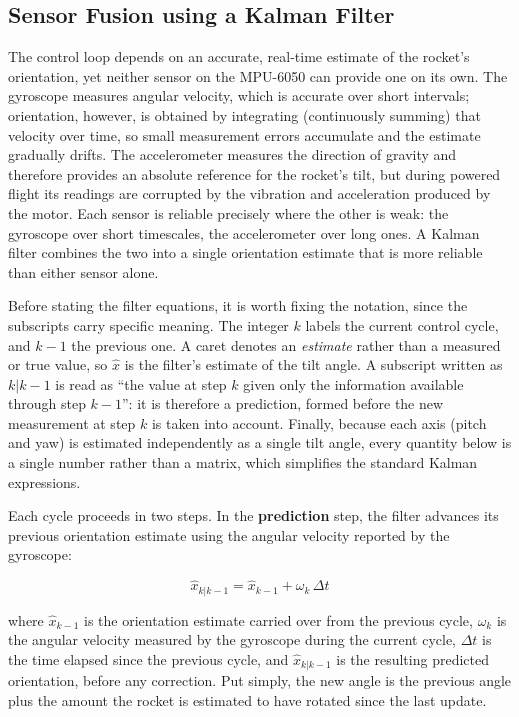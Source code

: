 \subsection{Sensor Fusion using a Kalman Filter}
\label{subsec:kalman}
 
The control loop depends on an accurate, real-time estimate of the rocket's orientation, yet neither sensor on the MPU-6050 can provide one on its own. The gyroscope measures angular velocity, which is accurate over short intervals; orientation, however, is obtained by integrating (continuously summing) that velocity over time, so small measurement errors accumulate and the estimate gradually drifts. The accelerometer measures the direction of gravity and therefore provides an absolute reference for the rocket's tilt, but during powered flight its readings are corrupted by the vibration and acceleration produced by the motor. Each sensor is reliable precisely where the other is weak: the gyroscope over short timescales, the accelerometer over long ones. A Kalman filter \cite{kalman1960} combines the two into a single orientation estimate that is more reliable than either sensor alone.
 
Before stating the filter equations, it is worth fixing the notation, since the subscripts carry specific meaning. The integer $k$ labels the current control cycle, and $k-1$ the previous one. A caret denotes an \emph{estimate} rather than a measured or true value, so $\hat{x}$ is the filter's estimate of the tilt angle. A subscript written as $k|k-1$ is read as ``the value at step $k$ given only the information available through step $k-1$'': it is therefore a prediction, formed before the new measurement at step $k$ is taken into account. Finally, because each axis (pitch and yaw) is estimated independently as a single tilt angle, every quantity below is a single number rather than a matrix, which simplifies the standard Kalman expressions.
 
Each cycle proceeds in two steps. In the \textbf{prediction} step, the filter advances its previous orientation estimate using the angular velocity reported by the gyroscope:
 
\[
\hat{x}_{k|k-1} = \hat{x}_{k-1} + \omega_k\,\Delta t
\]
 
where $\hat{x}_{k-1}$ is the orientation estimate carried over from the previous cycle, $\omega_k$ is the angular velocity measured by the gyroscope during the current cycle, $\Delta t$ is the time elapsed since the previous cycle, and $\hat{x}_{k|k-1}$ is the resulting predicted orientation, before any correction. Put simply, the new angle is the previous angle plus the amount the rocket is estimated to have rotated since the last update.
 
